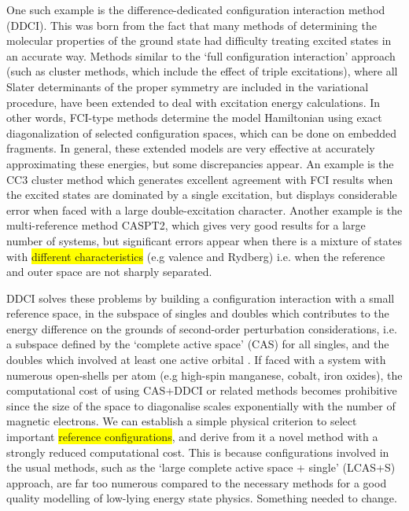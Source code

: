 \documentclass[10pt]{article}
\newcommand{\hilight}[1]{\colorbox{yellow}{#1}}
\begin{document}
One such example is the difference-dedicated configuration interaction method (DDCI). This was born from the fact that many methods of determining the molecular properties of the ground state had difficulty treating excited states in an accurate way. Methods similar to the `full configuration interaction' approach (such as cluster methods, which include the effect of triple excitations), where all Slater determinants of the proper symmetry are included in the variational procedure, have been extended to deal with excitation energy calculations. In other words, FCI-type methods determine the model Hamiltonian using exact diagonalization of selected configuration spaces, which can be done on embedded fragments. In general, these extended models are very effective at accurately approximating these energies, but some discrepancies appear. An example is the CC3 cluster method which generates excellent agreement with FCI results when the excited states are dominated by a single excitation, but displays considerable error when faced with a large double-excitation character. Another example is the multi-reference method CASPT2, which gives very good results for a large number of systems, but significant errors appear when there is a mixture of states with \hilight{different characteristics} (e.g valence and Rydberg) i.e. when the reference and outer space are not sharply separated.

DDCI solves these problems by building a configuration interaction with a small reference space, in the subspace of singles and doubles which contributes to the energy difference on the grounds of second-order perturbation considerations, i.e. a subspace defined by the `complete active space' (CAS) for all singles, and the doubles which involved at least one active orbital \cite{garcia1997application}. If faced with a system with numerous open-shells per atom (e.g high-spin manganese, cobalt, iron oxides), the computational cost of using CAS+DDCI or related methods becomes prohibitive since the size of the space to diagonalise scales exponentially with the number of magnetic electrons. We can establish a simple physical criterion to select important \hilight{reference configurations}, and derive from it a novel method with a strongly reduced computational cost. This is because configurations involved in the usual methods, such as the `large complete active space + single' (LCAS+S) approach, are far too numerous compared to the necessary methods for a good quality modelling of low-lying energy state physics. Something needed to change.
\end{document}
